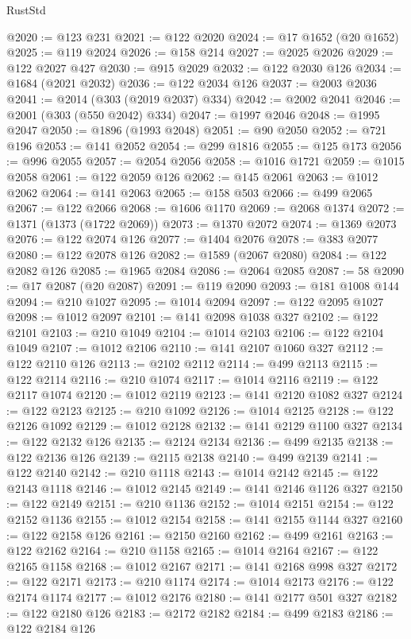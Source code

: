 \begin{lexlean}{RustStd}
\begin{coremodule}
{\begin{coremodule}
{{{{{{{{{{{{{{{{{{{{{{{{{{{{{{{{{{{{{{{{{{{{{{{{{{{{{{{{{{{{{{{{{{{{@2020 := @123 @231
@2021 := @122 @2020
@2024 := @17 @1652 (@20 @1652)
@2025 := @119 @2024
@2026 := @158 @214
@2027 := @2025 @2026
@2029 := @122 @2027 @427
@2030 := @915 @2029
@2032 := @122 @2030 @126
@2034 := @1684 (@2021 @2032)
@2036 := @122 @2034 @126
@2037 := @2003 @2036
@2041 := @2014 (@303 (@2019 @2037) @334)
@2042 := @2002 @2041
@2046 := @2001 (@303 (@550 @2042) @334)
@2047 := @1997 @2046
@2048 := @1995 @2047
@2050 := @1896 (@1993 @2048)
@2051 := @90 @2050
@2052 := @721 @196
@2053 := @141 @2052
@2054 := @299 @1816
@2055 := @125 @173
@2056 := @996 @2055
@2057 := @2054 @2056
@2058 := @1016 @1721
@2059 := @1015 @2058
@2061 := @122 @2059 @126
@2062 := @145 @2061
@2063 := @1012 @2062
@2064 := @141 @2063
@2065 := @158 @503
@2066 := @499 @2065
@2067 := @122 @2066
@2068 := @1606 @1170
@2069 := @2068 @1374
@2072 := @1371 (@1373 (@1722 @2069))
@2073 := @1370 @2072
@2074 := @1369 @2073
@2076 := @122 @2074 @126
@2077 := @1404 @2076
@2078 := @383 @2077
@2080 := @122 @2078 @126
@2082 := @1589 (@2067 @2080)
@2084 := @122 @2082 @126
@2085 := @1965 @2084
@2086 := @2064 @2085
@2087 := 58
@2090 := @17 @2087 (@20 @2087)
@2091 := @119 @2090
@2093 := @181 @1008 @144
@2094 := @210 @1027
@2095 := @1014 @2094
@2097 := @122 @2095 @1027
@2098 := @1012 @2097
@2101 := @141 @2098 @1038 @327
@2102 := @122 @2101
@2103 := @210 @1049
@2104 := @1014 @2103
@2106 := @122 @2104 @1049
@2107 := @1012 @2106
@2110 := @141 @2107 @1060 @327
@2112 := @122 @2110 @126
@2113 := @2102 @2112
@2114 := @499 @2113
@2115 := @122 @2114
@2116 := @210 @1074
@2117 := @1014 @2116
@2119 := @122 @2117 @1074
@2120 := @1012 @2119
@2123 := @141 @2120 @1082 @327
@2124 := @122 @2123
@2125 := @210 @1092
@2126 := @1014 @2125
@2128 := @122 @2126 @1092
@2129 := @1012 @2128
@2132 := @141 @2129 @1100 @327
@2134 := @122 @2132 @126
@2135 := @2124 @2134
@2136 := @499 @2135
@2138 := @122 @2136 @126
@2139 := @2115 @2138
@2140 := @499 @2139
@2141 := @122 @2140
@2142 := @210 @1118
@2143 := @1014 @2142
@2145 := @122 @2143 @1118
@2146 := @1012 @2145
@2149 := @141 @2146 @1126 @327
@2150 := @122 @2149
@2151 := @210 @1136
@2152 := @1014 @2151
@2154 := @122 @2152 @1136
@2155 := @1012 @2154
@2158 := @141 @2155 @1144 @327
@2160 := @122 @2158 @126
@2161 := @2150 @2160
@2162 := @499 @2161
@2163 := @122 @2162
@2164 := @210 @1158
@2165 := @1014 @2164
@2167 := @122 @2165 @1158
@2168 := @1012 @2167
@2171 := @141 @2168 @998 @327
@2172 := @122 @2171
@2173 := @210 @1174
@2174 := @1014 @2173
@2176 := @122 @2174 @1174
@2177 := @1012 @2176
@2180 := @141 @2177 @501 @327
@2182 := @122 @2180 @126
@2183 := @2172 @2182
@2184 := @499 @2183
@2186 := @122 @2184 @126
}}}}}}}}}}}}}}}}}}}}}}}}}}}}}}}}}}}}}}}}}}}}}}}}}}}}}}}}}}}}}}}}}}}}
\end{coremodule}}
\end{coremodule}
\end{lexlean}
